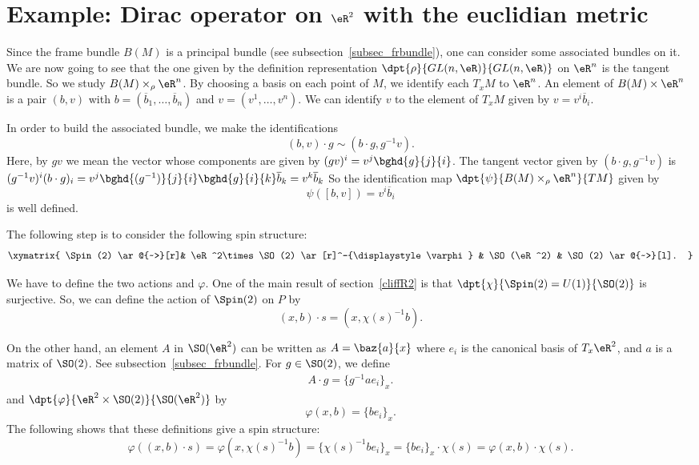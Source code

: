 \section[Dirac operator on  \texorpdfstring{$\eR^2$}{R2}]{Example: Dirac operator on \texorpdfstring{$\eR^2$}{R2} with the euclidian metric}\label{Pg_exempleRdeux}


Since the frame bundle $B(M)$ is a principal bundle (see subsection~\ref{subsec_frbundle}), one can consider some associated bundles on it. We are now going to see that the one given by the definition representation $\dpt{\rho}{GL(n,\eR)}{GL(n,\eR)}$ on $\eR^n$ is the tangent bundle. So we study $B(M)\times_{\rho} \eR^n$. By choosing a basis on each point of $M$, we identify each $T_xM$ to $\eR^n$. An element of $B(M)\times \eR^n$ is a pair $(b,v)$ with $b=(\overline{b}_1,\ldots,\overline{b}_n)$ and $v=(v^1,\ldots,v^n)$. We can identify $v$ to the element of $T_xM$ given by $v=v^i\overline{b}_i$.

In order to build the associated bundle, we make the identifications
\[
  (b,v)\cdot g\sim(b\cdot g,g^{-1} v).
\]
Here, by $gv$ we mean the vector whose components are given by $(gv)^i=v^j\bghd{g}{j}{i}$. The tangent vector given by $(b\cdot g,g^{-1} v)$ is $(g^{-1} v)^i(b\cdot g)_i=v^j\bghd{(g^{-1})}{j}{i}\bghd{g}{i}{k}\overline{b}_k=v^k\overline{b}_k$ So the identification map $\dpt{\psi}{B(M)\times_{\rho}\eR^n}{TM}$ given by
\[
  \psi([b,v])=v^i\overline{b}_i
\]
is well defined.

The following step is to consider the following spin structure:
 \[\xymatrix{
    \Spin(2)  \ar@{~>}[r]&  \eR^2\times \SO(2) \ar[r]^-{\displaystyle\varphi} & \SO(\eR^2)  & \SO(2) \ar@{~>}[l].
  }\]

We have to define the two actions and $\varphi$. One of the main result of section~\ref{cliffR2} is that $\dpt{\chi}{\Spin(2)=U(1)}{\SO(2)}$ is surjective. So, we can define the action of $\Spin(2)$ on $P$ by
\[(x,b)\cdot s=(x,\chi(s)^{-1} b).\]

On the other hand, an element $A$ in $\SO(\eR^2)$ can be written as $A=\baz{a}{x}$ where $e_i$ is the canonical basis of $T_x\eR^2$, and $a$ is a matrix of $\SO(2)$. See subsection~\ref{subsec_frbundle}. For $g\in \SO(2)$, we define
\begin{eqnarray}
 \label{r1504d2}A\cdot g=\{g^{-1} ae_i\}_x.
\end{eqnarray}
and  $\dpt{\varphi}{\eR^2\times \SO(2)}{\SO(\eR^2)}$ by
\[
\varphi(x,b)=\{be_i\}_x.
\]
The following shows that these definitions give a spin structure:
\begin{equation}
   \varphi((x,b)\cdot s)=\varphi(x,\chi(s)^{-1} b)
                    =\{\chi(s)^{-1} be_i\}_x
                    =\{be_i\}_x\cdot\chi(s)
                    =\varphi(x,b)\cdot\chi(s).
\end{equation}


